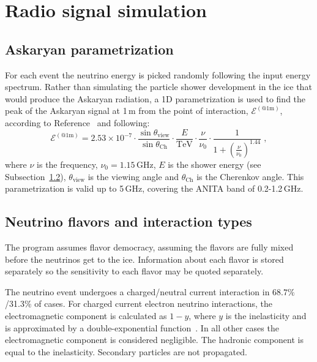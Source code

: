 \section{Radio signal simulation} 
\label{sec:rf}

\subsection{Askaryan parametrization}
For each event the neutrino energy is picked randomly following the input energy spectrum.
Rather than simulating the particle shower development in the ice that
would produce the Askaryan radiation, a 1D parametrization is used 
to find the peak of the Askaryan signal at 1\,m from the point of interaction, $\mathcal{E}^{(\mathrm{@ 1m})}$, 
according to Reference~\cite{JaimeAskarian2000} and following:
\begin{equation}
\label{eq:vmmhz}
\mathcal{E}^{(\mathrm{@ 1m})} =2.53\times 10^{-7}\cdot \frac{\sin{\theta_{\mathrm{view}}}}{\sin{\theta_{\mathrm{Ch}}}}\cdot  \frac{E}{\mathrm{TeV}} \cdot \frac{\nu}{\nu_0} \cdot \frac{1}{1+\left( \frac{\nu}{\nu_0} \right)^{1.44}} \;,
\end{equation}
\noindent where $\nu$ is the frequency, $\nu_0=1.15$\,GHz, $E$ is
the shower energy (see Subsection~\ref{subsec:emhadshower}),
$\theta_{\mathrm{view}}$ is the viewing angle and $\theta_{\mathrm{Ch}}$ is the Cherenkov angle.
This parametrization is valid up to 5\,GHz, covering the ANITA
band of 0.2-1.2\,GHz.

\subsection{Neutrino flavors and interaction types}
\label{subsec:emhadshower}
The \icemc program assumes flavor democracy, assuming 
the flavors are fully mixed before the neutrinos get to the ice.
Information about each flavor is stored separately so the sensitivity to each flavor may be quoted separately.

The neutrino event undergoes a charged/neutral current interaction in
$68.7\%$/31.3\% of cases.
For charged current electron neutrino interactions, the electromagnetic
component is calculated as $1-y$, where $y$ is the inelasticity and is
approximated by a double-exponential function~\cite{gandhi}. 
In all other cases the electromagnetic component is considered negligible.
The hadronic component is equal to the inelasticity.
Secondary particles are not propagated.

